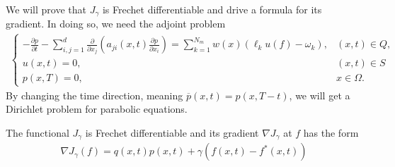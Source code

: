 \documentclass[]{article}
\begin{document}
We will prove that $J_\gamma$ is Frechet differentiable and drive a formula for its gradient. In doing so, we need the adjoint problem
\begin{align}\label{2.5} 
	\begin{cases}
		-\frac{\partial p}{\partial t}-\sum_{i, j=1}^{d}\frac{\partial}{\partial x_j}\left(a_{ji}(x, t)\frac{\partial p}{\partial x_i}\right)=\sum_{k=1}^{N_m}w(x)\left(\ell_k u(f)-\omega_k\right), & (x, t)\in Q,\\
		u(x, t)=0, & (x, t)\in S\\
		p(x, T)=0, & x\in \Omega.
	\end{cases}
\end{align}
By changing the time direction, meaning $\overline{p}(x, t)=p(x, T-t)$, we will get a Dirichlet problem for parabolic equations.
\begin{dl}
	The functional $J_\gamma$ is Frechet differentiable and its gradient $\nabla J_\gamma$ at $f$ has the form 
	\begin{align}\label{2.6}
		\nabla J_\gamma(f)=q(x, t)p(x, t)+\gamma \left(f(x, t)-f^*(x, t)\right)
	\end{align}
\end{dl}
\end{document}
